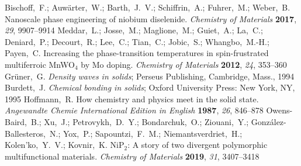 \documentclass[journal=cmatex,manuscript=article]{achemso}
\begin{document}
\begin{mcitethebibliography}{73}
	Bischoff,~F.; Auwärter,~W.; Barth,~J.~V.; Schiffrin,~A.; Fuhrer,~M.; Weber,~B.
	Nanoscale phase engineering of niobium diselenide. \emph{Chemistry of
		Materials} \textbf{2017}, \emph{29}, 9907--9914\relax
	\mciteBstWouldAddEndPuncttrue
	\mciteSetBstMidEndSepPunct{\mcitedefaultmidpunct}
	{\mcitedefaultendpunct}{\mcitedefaultseppunct}\relax
	\EndOfBibitem
	Meddar,~L.; Josse,~M.; Maglione,~M.; Guiet,~A.; La,~C.; Deniard,~P.;
	Decourt,~R.; Lee,~C.; Tian,~C.; Jobic,~S.; Whangbo,~M.-H.; Payen,~C.
	Increasing the phase-transition temperatures in spin-frustrated multiferroic
	{MnWO}$_4$ by {Mo} doping. \emph{Chemistry of Materials} \textbf{2012},
	\emph{24}, 353--360\relax
	\mciteBstWouldAddEndPuncttrue
	\mciteSetBstMidEndSepPunct{\mcitedefaultmidpunct}
	{\mcitedefaultendpunct}{\mcitedefaultseppunct}\relax
	\EndOfBibitem
	Gr\"uner,~G. \emph{Density waves in solids}; Perseus Publishing, Cambridge,
	Mass., 1994\relax
	\mciteBstWouldAddEndPuncttrue
	\mciteSetBstMidEndSepPunct{\mcitedefaultmidpunct}
	{\mcitedefaultendpunct}{\mcitedefaultseppunct}\relax
	\EndOfBibitem
	Burdett,~J. \emph{Chemical bonding in solids}; Oxford University Press: New
	York, NY, 1995\relax
	\mciteBstWouldAddEndPuncttrue
	\mciteSetBstMidEndSepPunct{\mcitedefaultmidpunct}
	{\mcitedefaultendpunct}{\mcitedefaultseppunct}\relax
	\EndOfBibitem
	Hoffmann,~R. How chemistry and physics meet in the solid state.
	\emph{Angewandte Chemie International Edition in English} \textbf{1987},
	\emph{26}, 846--878\relax
	\mciteBstWouldAddEndPuncttrue
	\mciteSetBstMidEndSepPunct{\mcitedefaultmidpunct}
	{\mcitedefaultendpunct}{\mcitedefaultseppunct}\relax
	\EndOfBibitem
	Owens-Baird,~B.; Xu,~J.; Petrovykh,~D.~Y.; Bondarchuk,~O.; Ziouani,~Y.;
	Gonz{\'{a}}lez-Ballesteros,~N.; Yox,~P.; Sapountzi,~F.~M.;
	Niemantsverdriet,~H.; Kolen'ko,~Y.~V.; Kovnir,~K. {NiP}$_{2}$: A story of two
	divergent polymorphic multifunctional materials. \emph{Chemistry of
		Materials} \textbf{2019}, \emph{31}, 3407--3418\relax
	\mciteBstWouldAddEndPuncttrue
	\mciteSetBstMidEndSepPunct{\mcitedefaultmidpunct}

\end{mcitethebibliography}
\end{document}
